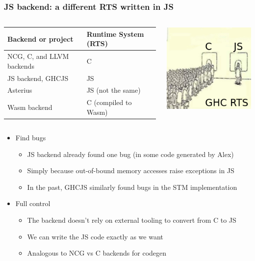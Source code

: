 \documentclass{beamer}
\begin{document}
\begin{frame}
\frametitle{JS backend: a different RTS written in JS}

\begin{columns}

\begin{column}{0.7\textwidth}
\resizebox{8cm}{!}
{
\begin{tabular}{ll}
\hline
\textbf{Backend or project} & \textbf{Runtime System (RTS)} \\ \hline
NCG, C, and LLVM backends & C \\
JS backend, GHCJS         & JS \\
Asterius                  & JS (not the same) \\
Wasm backend & C (compiled to Wasm) \\ \hline
\end{tabular}
}
\end{column}

\begin{column}{0.2\textwidth}
\includegraphics[scale=0.3]{images/queue_rts.png}
\end{column}
\end{columns}

\vspace{1cm}

\begin{itemize}
\item Find bugs
\begin{itemize}
\item JS backend already found one bug (in some code generated by Alex)
\item Simply because out-of-bound memory accesses raise exceptions in JS
\item In the past, GHCJS similarly found bugs in the STM implementation
\end{itemize}
\item Full control
\begin{itemize}
\item The backend doesn’t rely on external tooling to convert from C to JS
\item We can write the JS code exactly as we want
\item Analogous to NCG vs C backends for codegen
\end{itemize}
\end{itemize}
\end{frame}
\end{document}
